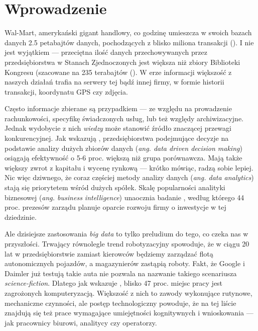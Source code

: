 \documentclass[polish, twoside, 12pt, a4paper]{article}
\theoremstyle{definition}
\theoremstyle{plain}
\theoremstyle{remark}
\begin{document}
\cleardoublepage
\section{Wprowadzenie}

Wal-Mart, amerykański gigant handlowy, co godzinę umieszcza w swoich bazach danych 2.5 petabajtów danych, pochodzących z blisko miliona transakcji (\cite{Economist2010}). I nie jest wyjątkiem --- przeciętna ilość danych przechowywanych przez przedsiębiorstwa w Stanach Zjednoczonych jest większa niż zbiory Biblioteki Kongresu (szacowane na 235 terabajtów (\cite{McKinsey2011}). W erze informacji większość z naszych działań trafia na serwery tej bądź innej firmy, w formie historii transakcji, koordynatu GPS czy zdjęcia. 

Często informacje zbierane są przypadkiem --- ze względu na prowadzenie rachunkowości, specyfikę świadczonych usług, lub też względy archiwizacyjne. Jednak wydobycie z nich \textit{wiedzy} może stanowić źródło znaczącej przewagi konkurencyjnej.  Jak wskazują \cite{Brynjolfsson2011}, przedsiębiorstwa podejmujące decyzje na podstawie analizy dużych zbiorów danych (\textit{ang. data driven decision making}) osiągają efektywność o 5-6 proc. większą niż grupa porównawcza. Mają także większy zwrot z kapitału i wycenę rynkową --- krótko mówiąc, radzą sobie lepiej. Nic więc dziwnego, że coraz częściej metody analizy danych (\textit{ang. data analytics}) stają się priorytetem wśród dużych spółek. Skalę popularności analityki biznesowej (\textit{ang. business intelligence}) unaocznia badanie \cite{PwC2014}, według którego 44 proc. prezesów zarządu planuje oparcie rozwoju firmy o inwestycje w tej dziedzinie. 

Ale dzisiejsze zastosowania \textit{big data} to tylko preludium do tego, co czeka nas w przyszłości. Trwający równolegle trend robotyzacyjny spowoduje, że w ciągu 20 lat w przedsiębiorstwie zamiast kierowców będziemy zarządzać flotą autonomicznych pojazdów, a magazynierów zastąpią roboty. Fakt, że Google i Daimler już testują takie auta nie pozwala na nazwanie takiego scenariusza \textit{science-fiction}. Dlatego jak wskazuje \cite{frey2013}, blisko 47 proc. miejsc pracy jest zagrożonych komputeryzacją. Większość z nich to zawody wykonujące rutynowe, mechaniczne czynności, ale postęp technologiczny powoduje, że na tej liście znajdują się też prace wymagające umiejętności kognitywnych i wnioskowania --- jak pracownicy biurowi, analitycy czy operatorzy. 
\end{document}
